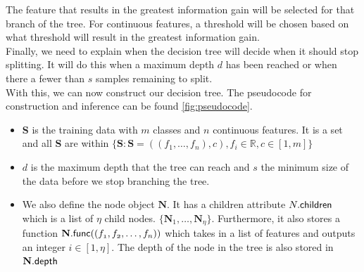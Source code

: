 The feature that results in the greatest information gain will be selected for that branch of the tree. For continuous features, a threshold will be chosen based on what threshold will result in the greatest information gain. \\

Finally, we need to explain when the decision tree will decide when it should stop splitting. It will do this when a maximum depth $d$ has been reached or when there a fewer than $s$ samples remaining to split. \\

 With this, we can now construct our decision tree. The pseudocode for construction and inference can be found \ref{fig:pseudocode}.
\begin{itemize}
	\item \textbf{S} is the training data with $m$ classes and $n$ continuous features. It is a set and all \textbf{S} are within $\{\textbf{S} : \textbf{S} = {((f_1,\dots,f_n),c),f_i\in\mathbb{R},c\in [1,m]}\}$
	\item $d$ is the maximum depth that the tree can reach and $s$ the minimum size of the data before we stop branching the tree.
	\item We also define the node object $\textbf{N}$. It has a children attribute $N.\sf{children}$ which is a list of $\eta$ child nodes. $\{\textbf{N}_1,\dots,\textbf{N}_\eta\}$. Furthermore, it also stores a function $\textbf{N}.\sf{func}(\mathnormal{(f_1,f_2,\dots,f_n)})$ which takes in a list of features and outputs an integer $i\in[1,\eta]$. The depth of the node in the tree is also stored in $\textbf{N}.\sf{depth}$
\end{itemize}


